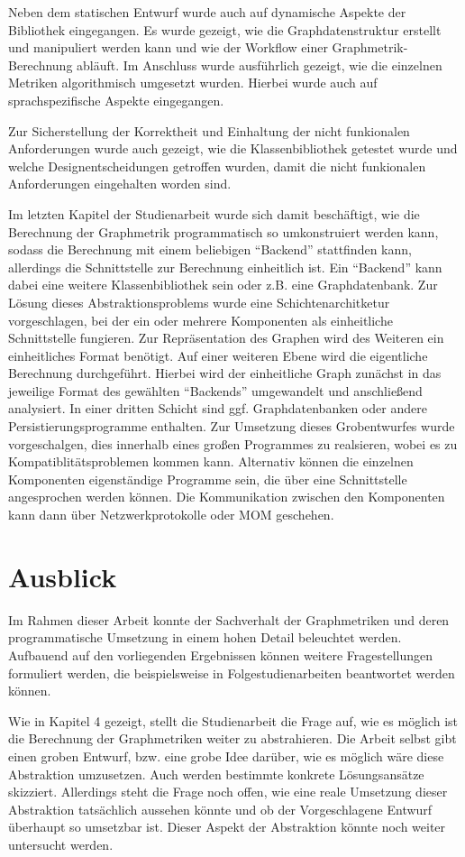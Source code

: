 \documentclass[a4paper,12pt,ngerman,chapterprefix=false,listof=totoc,bibliography=totoc]{scrreprt}
\begin{document}
{{{Neben dem statischen Entwurf wurde auch auf dynamische Aspekte der Bibliothek eingegangen. Es wurde gezeigt, wie die Graphdatenstruktur erstellt und manipuliert werden kann und wie der Workflow einer Graphmetrik-Berechnung abläuft. Im Anschluss wurde ausführlich gezeigt, wie die einzelnen Metriken algorithmisch umgesetzt wurden. Hierbei wurde auch auf sprachspezifische Aspekte eingegangen.

Zur Sicherstellung der Korrektheit und Einhaltung der nicht funkionalen Anforderungen wurde auch gezeigt, wie die Klassenbibliothek getestet wurde und welche Designentscheidungen getroffen wurden, damit die nicht funkionalen Anforderungen eingehalten worden sind.

Im letzten Kapitel der Studienarbeit wurde sich damit beschäftigt, wie die Berechnung der Graphmetrik programmatisch so umkonstruiert werden kann, sodass die Berechnung mit einem beliebigen "`Backend"' stattfinden kann, allerdings die Schnittstelle zur Berechnung einheitlich ist. Ein "`Backend"' kann dabei eine weitere Klassenbibliothek sein oder z.B. eine Graphdatenbank. Zur Lösung dieses Abstraktionsproblems wurde eine Schichtenarchitketur vorgeschlagen, bei der ein oder mehrere Komponenten als einheitliche Schnittstelle fungieren. Zur Repräsentation des Graphen wird des Weiteren ein einheitliches Format benötigt. Auf einer weiteren Ebene wird die eigentliche Berechnung durchgeführt. Hierbei wird der einheitliche Graph zunächst in das jeweilige Format des gewählten "`Backends"' umgewandelt und anschließend analysiert. In einer dritten Schicht sind ggf. Graphdatenbanken oder andere Persistierungsprogramme enthalten. Zur Umsetzung dieses Grobentwurfes wurde vorgeschalgen, dies innerhalb eines großen Programmes zu realsieren, wobei es zu Kompatiblitätsproblemen kommen kann. Alternativ können die einzelnen Komponenten eigenständige Programme sein, die über eine Schnittstelle angesprochen werden können. Die Kommunikation zwischen den Komponenten kann dann über Netzwerkprotokolle oder MOM geschehen.
}
\section{Ausblick}
{
Im Rahmen dieser Arbeit konnte der Sachverhalt der Graphmetriken und deren programmatische Umsetzung in einem hohen Detail beleuchtet werden. Aufbauend auf den vorliegenden Ergebnissen können weitere Fragestellungen formuliert werden, die beispielsweise in Folgestudienarbeiten beantwortet werden können. 

Wie in Kapitel 4 gezeigt, stellt die Studienarbeit die Frage auf, wie es möglich ist die Berechnung der Graphmetriken weiter zu abstrahieren. Die Arbeit selbst gibt einen groben Entwurf, bzw. eine grobe Idee darüber, wie es möglich wäre diese Abstraktion umzusetzen. Auch werden bestimmte konkrete Lösungsansätze skizziert. Allerdings steht die Frage noch offen, wie eine reale Umsetzung dieser Abstraktion tatsächlich aussehen könnte und ob der Vorgeschlagene Entwurf überhaupt so umsetzbar ist. Dieser Aspekt der Abstraktion könnte noch weiter untersucht werden.

}}}
\end{document}
